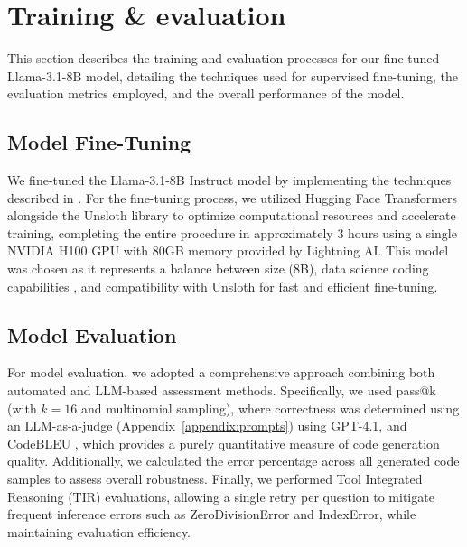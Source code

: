 \section{Training & evaluation}

This section describes the training and evaluation processes for our fine-tuned Llama-3.1-8B model, detailing the techniques used for supervised fine-tuning, the evaluation metrics employed, and the overall performance of the model.

\subsection{Model Fine-Tuning}

We fine-tuned the Llama-3.1-8B Instruct model \citep{Grattafiori2024Llama3, Unsloth2024WhatModel} by implementing the techniques described in \cite{Pareja2024RecipesSFT}. For the fine-tuning process, we utilized Hugging Face Transformers alongside the Unsloth library to optimize computational resources and accelerate training, completing the entire procedure in approximately 3 hours using a single NVIDIA H100 GPU with 80GB memory provided by Lightning AI. This model was chosen as it represents a balance between size (8B), data science coding capabilities \citep{Lai2022DS1000}, and compatibility with Unsloth for fast and efficient fine-tuning.



\subsection{Model Evaluation}

For model evaluation, we adopted a comprehensive approach combining both automated and LLM-based assessment methods. Specifically, we used pass@k \citep{Levi2024SimpleModelInferenceScalingLaws} (with $k=16$ and multinomial sampling), where correctness was determined using an LLM-as-a-judge \citep{Li2025LLMJudge} (Appendix~\ref{appendix:prompts}) using GPT-4.1, and CodeBLEU \citep{Ren2020CodeBLEU}, which provides a purely quantitative measure of code generation quality. Additionally, we calculated the error percentage across all generated code samples to assess overall robustness. Finally, we performed Tool Integrated Reasoning (TIR) \citep{Fleureau2024NuminaMath} evaluations, allowing a single retry per question to mitigate frequent inference errors such as ZeroDivisionError and IndexError, while maintaining evaluation efficiency.

